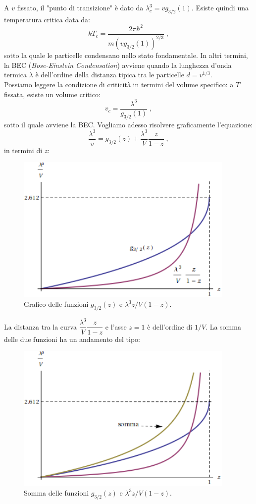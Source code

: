 \documentclass[10pt,a4paper]{report}
\theoremstyle{definition}
\numberwithin{equation}{section}
\begin{document}
A $v$ fissato, il "punto di transizione" è dato da $\lambda_c^3=vg_{3/2}(1)$. Esiste quindi una temperatura critica data da:
\begin{equation}
kT_c=\frac{2\pi\hbar^2}{m(vg_{3/2}(1))^{2/3}}\;,
\end{equation}
sotto la quale le particelle condensano nello stato fondamentale. In altri termini, la BEC (\emph{Bose-Einstein Condensation}) avviene quando la lunghezza d'onda termica $\lambda$ è dell'ordine della distanza tipica tra le particelle $d=v^{1/3}$. \\
Possiamo leggere la condizione di criticità in termini del volume specifico: a $T$ fissata, esiste un volume critico:
\begin{equation}
v_c=\frac{\lambda^3}{g_{3/2}(1)}\;,
\end{equation}
sotto il quale avviene la BEC. Vogliamo adesso risolvere graficamente l'equazione:
\begin{equation}
\frac{\lambda^3}{v}=g_{3/2}(z)+\frac{\lambda^3}{V}\frac{z}{1-z}\;,
\end{equation}
in termini di $z$:

\begin{figure}[h]
\centering
\includegraphics[width=300pt,keepaspectratio=true]{Addons/eq}
\caption{Grafico delle funzioni $g_{3/2}(z)$ e $\lambda^3 z/V(1-z)$.}
\end{figure}

La distanza tra la curva $\dfrac{\lambda^3}{V}\dfrac{z}{1-z}$ e l'asse $z=1$ è dell'ordine di $1/V$. La somma delle due funzioni ha un andamento del tipo:

\begin{figure}[h]
\centering
\includegraphics[width=300pt,keepaspectratio=true]{Addons/somma}
\caption{Somma delle funzioni $g_{3/2}(z)$ e $\lambda^3z/V(1-z)$.}
\end{figure}
\pagebreak
\end{document}
